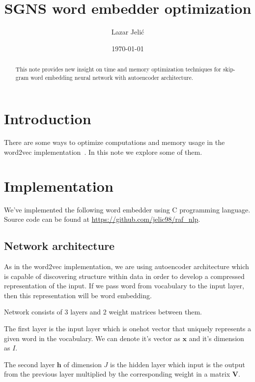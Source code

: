 \documentclass{article}
\title{SGNS word embedder optimization}
\author{Lazar Jelić}
\date{\today}
\begin{document}
\maketitle

\begin{abstract}

This note provides new insight on time and memory optimization techniques for
skip-gram word embedding neural network with autoencoder architecture.

\end{abstract}

\section{Introduction}

There are some ways to optimize computations and memory usage in the
word2vec implementation~\cite{1301.3781}. In this note we explore some of them.

\section{Implementation}

We've implemented the following word embedder using C programming language.
Source code can be found at \url{https://github.com/jelic98/raf_nlp}.

\subsection{Network architecture}

As in the word2vec implementation, we are using autoencoder
architecture which is capable of discovering structure within data in order
to develop a compressed representation of the input. If we pass word from
vocabulary to the input layer, then this representation will be word embedding.

\medbreak

Network consists of $3$ layers and $2$ weight matrices between them.

The first layer is the input layer which is onehot vector that uniquely represents a given word in the vocabulary.
We can denote it's vector as $\boldsymbol{x}$ and it's dimension as $I$.

\medbreak

The second layer $\boldsymbol{h}$ of dimension $J$ is the hidden layer which
input is the output from the previous
layer multiplied by the corresponding weight in a matrix $\boldsymbol{V}$.
\end{document}
